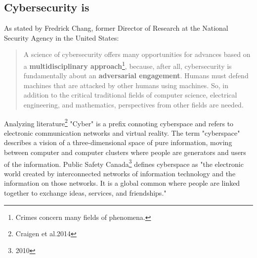 \subsection{Cybersecurity is}

As stated by Fredrick Chang, former Director of Research at the National Security Agency in the United States:
\begin{quotation}
    A science of cybersecurity offers many opportunities for advances based on a \textbf{multidisciplinary approach}\footnote{Crimes concern many fields of phenomena.}, because, after all, cybersecurity is fundamentally about an \textbf{adversarial engagement}. Humans must defend machines that are attacked by other humans using machines. So, in addition to the critical traditional fields of computer science, electrical engineering, and mathematics, perspectives from other fields are needed.
\end{quotation}

Analyzing literature\footnote{Craigen et al.2014} "Cyber" is a prefix connoting cyberspace and refers to electronic communication networks and virtual reality.
The term "cyberspace" describes a vision of a three-dimensional space of pure information, moving between computer and computer clusters where people are generators and users of the information. Public Safety Canada\footnote{2010} defines cyberspace as "the electronic world created by interconnected networks of information technology and the information on those networks. It is a global common where people are linked together to exchange ideas, services, and friendships."

